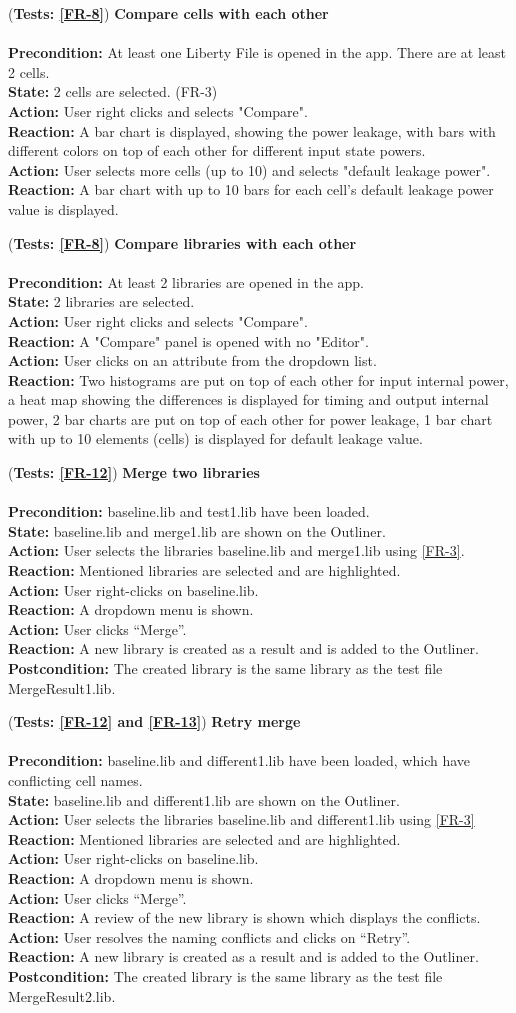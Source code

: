 \documentclass[10pt,a4paper]{report}
\newcommand{\precondition}[1]{
    \textbf{Precondition: } #1 \leavevmode \\
}
\newcommand{\postcondition}[1]{
    \textbf{Postcondition: } #1 \leavevmode \\
}
\newcommand{\action}[1]{
    \textbf{Action: } #1 \leavevmode \\
}
\newcommand{\state}[1]{
    \textbf{State: } #1 \leavevmode \\
}
\newcommand{\reaction}[1]{
    \textbf{Reaction: } #1 \leavevmode \\
}
\newcommand{\GTCDescription}[2]{
    (\textbf{Tests: #1}) \textbf{#2} \leavevmode \\
}
\begin{document}
\begin{GTC}
    \item \GTCDescription{\ref{FR-8}}{Compare cells with each other} \leavevmode \\ \precondition{At least one Liberty File is opened in the app. There are at least 2 cells.}\state{2 cells are selected. (FR-3)}\action{User right clicks and selects "Compare".}\reaction{A bar chart is displayed, showing the power leakage, with bars with different colors on top of each other for different input state powers.}\action{User selects more cells (up to 10) and selects "default leakage power".}\reaction{A bar chart with up to 10 bars for each cell's default leakage power value is displayed.
}
    
    \item \GTCDescription{\ref{FR-8}}{Compare libraries with each other} \leavevmode \\ \precondition{At least 2 libraries are opened in the app.}\state{2 libraries are selected.}\action{User right clicks and selects "Compare".}\reaction{ A "Compare" panel is opened with no "Editor".}\action{User clicks on an attribute from the dropdown list.}\reaction{Two histograms are put on top of each other for input internal power, a heat map  showing the differences is displayed for timing and output internal power, 2 bar   charts are put on top of each other for power leakage, 1 bar chart with up to 10 elements (cells) is displayed for default leakage value.}
    
    \item \GTCDescription{\ref{FR-12}}{Merge two libraries} \leavevmode \\ \precondition{baseline.lib and test1.lib have been loaded.}\state{baseline.lib and merge1.lib are shown on the Outliner.}\action{User selects the libraries baseline.lib and merge1.lib using \ref{FR-3}.}\reaction{Mentioned libraries are selected and are highlighted.}\action{User right-clicks on baseline.lib.}\reaction{A dropdown menu is shown.}\action{User clicks “Merge”.}\reaction{A new library is created as a result and is added to the Outliner.}\postcondition{The created library is the same library as the test file MergeResult1.lib.}
    
    \item \GTCDescription{\ref{FR-12} and \ref{FR-13}}{Retry merge} \leavevmode \\ \precondition{baseline.lib and different1.lib have been loaded, which have conflicting cell names.}\state{baseline.lib and different1.lib are shown on the Outliner.}\action{User selects the libraries baseline.lib and different1.lib using \ref{FR-3}}\reaction{Mentioned libraries are selected and are highlighted.}\action{User right-clicks on baseline.lib.}\reaction{A dropdown menu is shown.}\action{User clicks “Merge”.}\reaction{A review of the new library is shown which displays the conflicts.}\action{User resolves the naming conflicts and clicks on “Retry”.}\reaction{A new library is created as a result and is added to the Outliner.}\postcondition{The created library is the same library as the test file MergeResult2.lib.}
    

\end{GTC}
\end{document}
